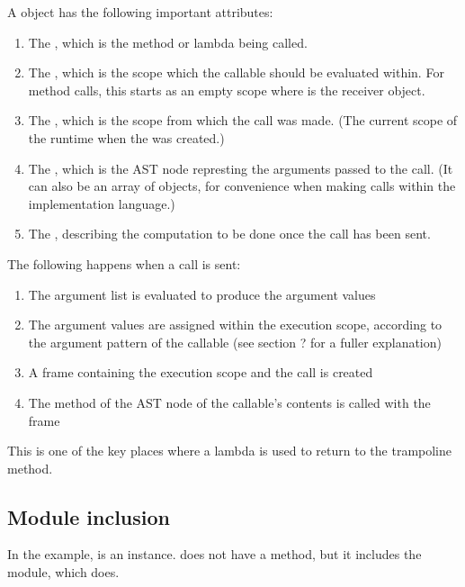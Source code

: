 A  object has the following important attributes:

\begin{enumerate}
  \item The , which is the method or lambda being called.
  \item The , which is the scope which the callable should be evaluated within. For method calls, this starts as an empty scope where  is the receiver object.
  \item The , which is the scope from which the call was made. (The current scope of the runtime when the  was created.)
  \item The , which is the  AST node represting the arguments passed to the call. (It can also be an array of objects, for convenience when making calls within the implementation language.)
  \item The , describing the computation to be done once the call has been sent.
\end{enumerate}

The following happens when a call is sent:

\begin{enumerate}
  \item The argument list is evaluated to produce the argument values
  \item The argument values are assigned within the execution scope, according to the argument pattern of the callable (see section ? for a fuller explanation)
  \item A frame containing the execution scope and the call is created
  \item The  method of the AST node of the callable's contents is called with the frame
\end{enumerate}

This is one of the key places where a lambda is used to return to the trampoline method.

\subsection{Module inclusion}
\label{sec:module_inclusion}

In the example,  is an  instance.  does not have a  method, but it includes the  module, which does.

